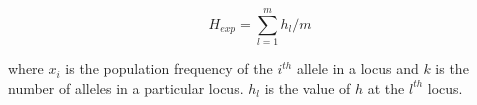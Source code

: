 \documentclass[letterpaper]{article}\usepackage[]{graphicx}\usepackage[]{color}
\newcommand{\poppr}{\textit{poppr}}
\begin{document}
\begin{equation}
H_{exp} = \sum_{l = 1}^m{h_l/m}
\end{equation}

where $x_i$ is the population frequency of the $i^{th}$ allele in a locus and $k$
is the number of alleles in a particular locus. $h_l$ is the value of $h$ at the
$l^{th}$ locus.

% 
% 



\end{document}
